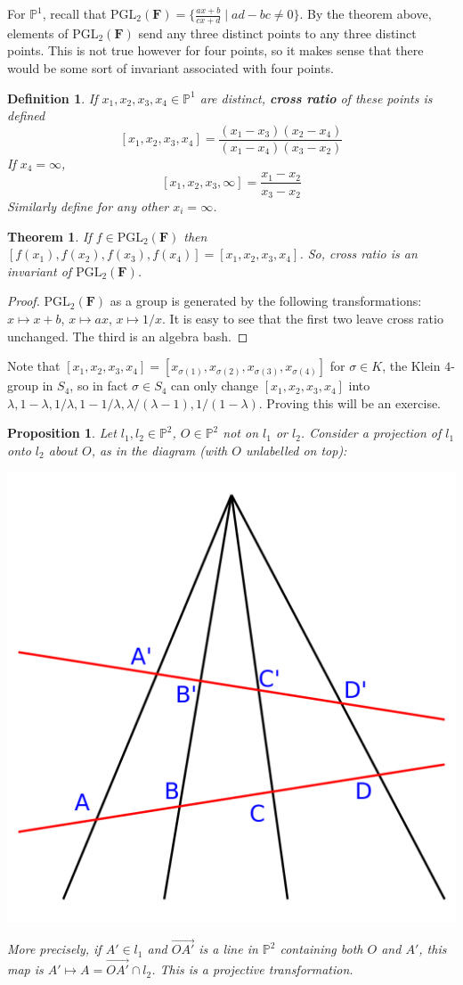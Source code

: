 \documentclass[12pt]{article}
\newcommand{\F}{\mathbf{F}}
\renewcommand{\P}{\mathbb{P}}
\renewcommand{\vec}{\overrightarrow}
\newcommand{\PGL}{\mathrm{PGL}}
\newtheorem{definition}{Definition}
\newtheorem{theorem}{Theorem}
\newtheorem{proposition}{Proposition}
\begin{document}
    For $\P^1$, recall that $\PGL_2(\F) = \{\frac{ax+b}{cx+d} \mid ad - bc \neq 0\}$. By the theorem above, elements of $\PGL_2(\F)$ send any three distinct points to any three distinct points. This is not true however for four points, so it makes sense that there would be some sort of invariant associated with four points. 
    \begin{definition}
        If $x_1, x_2, x_3, x_4 \in \P^1$ are distinct, \textbf{cross ratio} of these points is defined 
        $$[x_1, x_2, x_3, x_4] = \frac{(x_1-x_3)(x_2-x_4)}{(x_1-x_4)(x_3-x_2)}$$
        If $x_4 = \infty$, 
        $$[x_1, x_2, x_3, \infty] = \frac{x_1 - x_2}{x_3 - x_2}$$
        Similarly define for any other $x_i = \infty$. 
    \end{definition}
    \begin{theorem}
        If $f \in \PGL_2(\F)$ then $[f(x_1), f(x_2), f(x_3), f(x_4)] = [x_1, x_2, x_3, x_4]$. So, cross ratio is an invariant of $\PGL_2(\F)$.
    \end{theorem}
    \begin{proof}
        $\PGL_2(\F)$ as a group is generated by the following transformations: $x \mapsto x + b$, $x \mapsto ax$, $x \mapsto 1/x$. It is easy to see that the first two leave cross ratio unchanged. The third is an algebra bash. 
    \end{proof}
    Note that $[x_1, x_2, x_3, x_4] = [x_{\sigma(1)}, x_{\sigma(2)}, x_{\sigma(3)}, x_{\sigma(4)}]$ for $\sigma \in K$, the Klein $4$-group in $S_4$, so in fact $\sigma \in S_4$ can only change $[x_1, x_2, x_3, x_4]$ into $\lambda, 1-\lambda, 1/\lambda, 1-1/\lambda, \lambda/(\lambda-1), 1/(1-\lambda)$. Proving this will be an exercise. \par 
    \begin{proposition}
        Let $l_1, l_2 \in \P^2$, $O \in \P^2$ not on $l_1$ or $l_2$. Consider a projection of $l_1$ onto $l_2$ about $O$, as in the diagram (with $O$ unlabelled on top): 
        \begin{center}
            \includegraphics[width = 0.4\linewidth]{crossratio.png}
        \end{center}
        More precisely, if $A' \in l_1$ and $\vec{OA'}$ is a line in $\P^2$ containing both $O$ and $A'$, this map is $A' \mapsto A = \vec{OA'} \cap l_2$. This is a projective transformation. 
    \end{proposition} 
\end{document}
